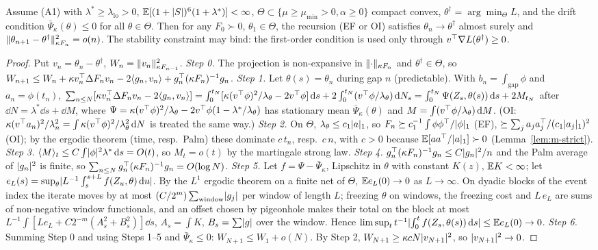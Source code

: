 \begin{theorem}\label{thm:m-as}\Pt{}
Assume (A1) with $\lambda^*\ge\lambda_{\mathrm{lo}}>0$, $\mathbb{E}[(1+\lvert S\rvert)^6(1+\lambda^*)]<\infty$, $\Theta\subset\{\mu\ge\mu_{\min}>0,\alpha\ge0\}$ compact convex, $\theta^\dagger=\arg\min_\Theta L$, and the drift condition $\bar\Psi_\kappa(\theta)\le0$ for all $\theta\in\Theta$. Then for any $F_0\succ0$, $\theta_1\in\Theta$, the recursion (EF or OI) satisfies $\theta_n\to\theta^\dagger$ almost surely and $\lVert \theta_{n+1}-\theta^\dagger\rVert^2_{\kappa F_n}=o(n)$. The stability constraint may bind: the first-order condition is used only through $v^{\top}\nabla L(\theta^\dagger)\ge0$.
\end{theorem}
\begin{proof}
Put $v_n=\theta_n-\theta^\dagger$, $W_n=\lVert v_n\rVert^2_{\kappa F_{n-1}}$.
\emph{Step 0.} The projection is non-expansive in $\lVert \cdot\rVert_{\kappa F_n}$ and $\theta^\dagger\in\Theta$, so $W_{n+1}\le W_n+\kappa v_n^{\top}\Delta F_nv_n-2\langle g_n,v_n\rangle+g_n^{\top}(\kappa F_n)^{-1}g_n$.
\emph{Step 1.} Let $\theta(s)=\theta_n$ during gap $n$ (predictable). With $b_n=\int_{\text{gap}}\phi$ and $a_n=\phi(t_n)$, $\sum_{n\le N}[\kappa v_n^{\top}\Delta F_nv_n-2\langle g_n,v_n\rangle]=\int_0^{t_N}[\kappa(v^{\top}\phi)^2/\lambda_\theta-2v^{\top}\phi]\,\mathrm d s+2\int_0^{t_N}(v^{\top}\phi/\lambda_\theta)\,\mathrm d N_s=\int_0^{t_N}\Psi(Z_s,\theta(s))\,\mathrm d s+2M_{t_N}$ after $\dd N=\lambda^*\dd s+\dd M$, where $\Psi=\kappa(v^{\top}\phi)^2/\lambda_\theta-2v^{\top}\phi(1-\lambda^*/\lambda_\theta)$ has stationary mean $\bar\Psi_\kappa(\theta)$ and $M=\int(v^{\top}\phi/\lambda_\theta)\,\mathrm d M$. (OI: $\kappa(v^{\top} a_n)^2/\lambda_n^2=\int\kappa(v^{\top}\phi)^2/\lambda_\theta^2\,\mathrm d N$ is treated the same way.)
\emph{Step 2.} On $\Theta$, $\lambda_\theta\le c_1\lvert a\rvert_1$, so $F_n\succeq c_1^{-1}\int\phi\phi^{\top}/\lvert \phi\rvert_1$ (EF), $\succeq\sum_ja_ja_j^{\top}/(c_1\lvert a_j\rvert_1)^2$ (OI); by the ergodic theorem (time, resp.\ Palm) these dominate $c\,t_n$, resp.\ $c\,n$, with $c>0$ because $\mathbb{E}[aa^{\top}/\lvert a\rvert_1]\succ0$ (Lemma~\ref{lem:m-strict}).
\emph{Step 3.} $\langle M\rangle_t\le C\int\lvert \phi\rvert^2\lambda^*\,\mathrm d s=O(t)$, so $M_t=o(t)$ by the martingale strong law.
\emph{Step 4.} $g_n^{\top}(\kappa F_n)^{-1}g_n\le C\lvert g_n\rvert^2/n$ and the Palm average of $\lvert g_n\rvert^2$ is finite, so $\sum_{n\le N}g_n^{\top}(\kappa F_n)^{-1}g_n=O(\log N)$.
\emph{Step 5.} Let $f=\Psi-\bar\Psi_\kappa$, Lipschitz in $\theta$ with constant $K(z)$, $\mathbb{E} K<\infty$; let $e_L(s)=\sup_\theta\lvert L^{-1}\int_s^{s+L}f(Z_u,\theta)\,\mathrm d u\rvert$. By the $L^1$ ergodic theorem on a finite net of $\Theta$, $\mathbb{E} e_L(0)\to0$ as $L\to\infty$. On dyadic blocks of the event index the iterate moves by at most $(C/2^m)\sum_{\text{window}}\lvert g_j\rvert$ per window of length $L$; freezing $\theta$ on windows, the freezing cost and $L\,e_L$ are sums of non-negative window functionals, and an offset chosen by pigeonhole makes their total on the block at most $L^{-1}\int[Le_L+C2^{-m}(A_s^2+B_s^2)]\dd s$, $A_s=\int K$, $B_s=\sum\lvert g\rvert$ over the window. Hence $\limsup_tt^{-1}\lvert \int_0^tf(Z_s,\theta(s))\,\mathrm d s\rvert\le\mathbb{E} e_L(0)\to0$.
\emph{Step 6.} Summing Step 0 and using Steps 1--5 and $\bar\Psi_\kappa\le0$: $W_{N+1}\le W_1+o(N)$. By Step 2, $W_{N+1}\ge\kappa cN\lvert v_{N+1}\rvert^2$, so $\lvert v_{N+1}\rvert^2\to0$.
\end{proof}
